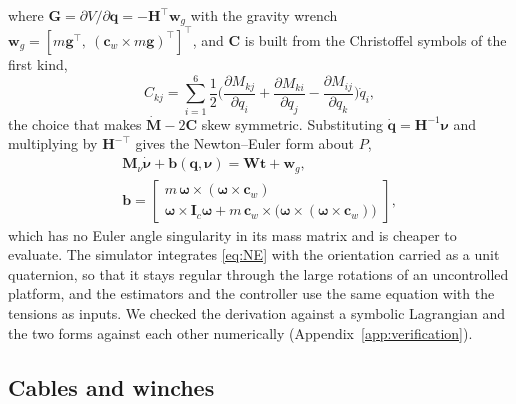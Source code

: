 \documentclass[a4paper,fleqn]{cas-dc}
\newcommand{\vc}[1]{\bm{#1}}
\newcommand{\mt}[1]{\mathbf{#1}}
\begin{document}
where $\vc G=\partial V/\partial\vc q=-\mt H^\top\vc w_g$ with the gravity wrench $\vc w_g=[m\vc g^\top,\ (\vc c_w\times m\vc g)^\top]^\top$, and $\mt C$ is built from the Christoffel symbols of the first kind,
\begin{equation}\label{eq:C}
C_{kj}=\sum_{i=1}^{6}\frac12\Big(\frac{\partial M_{kj}}{\partial q_i}+\frac{\partial M_{ki}}{\partial q_j}-\frac{\partial M_{ij}}{\partial q_k}\Big)\dot q_i,
\end{equation}
the choice that makes $\dot{\mt M}-2\mt C$ skew symmetric. Substituting $\dot{\vc q}=\mt H^{-1}\vc\nu$ and multiplying by $\mt H^{-\top}$ gives the Newton--Euler form about $P$,
\begin{equation}\label{eq:NE}
\begin{gathered}
\mt M_\nu\dot{\vc\nu}+\vc b(\vc q,\vc\nu)=\mt W\vc t+\vc w_g,\\
\vc b=\begin{bmatrix}m\,\vc\omega\times(\vc\omega\times\vc c_w)\\ \vc\omega\times\mt I_c\vc\omega+m\,\vc c_w\times\big(\vc\omega\times(\vc\omega\times\vc c_w)\big)\end{bmatrix},
\end{gathered}
\end{equation}
which has no Euler angle singularity in its mass matrix and is cheaper to evaluate. The simulator integrates \eqref{eq:NE} with the orientation carried as a unit quaternion, so that it stays regular through the large rotations of an uncontrolled platform, and the estimators and the controller use the same equation with the tensions as inputs. We checked the derivation against a symbolic Lagrangian and the two forms against each other numerically (Appendix~\ref{app:verification}).

\subsection{Cables and winches}\label{sec:cables}
\end{document}

